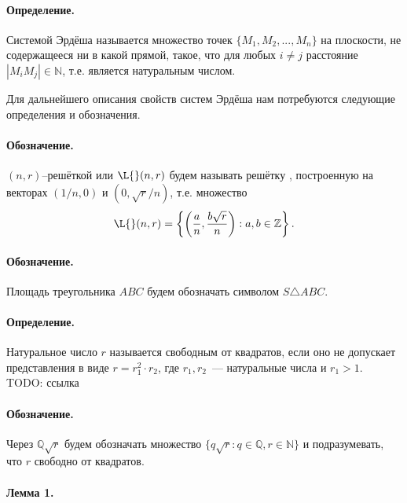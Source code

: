\documentclass[a4paper,14pt]{article} %
\begin{document}
\renewcommand{\bibname}{Список цитированной литературы}
\renewcommand\refname{\bibname}

\paragraph{Определение.}
Системой Эрдёша называется множество точек $\{M_1, M_2, ..., M_n\}$ на плоскости, не содержащееся ни в какой прямой,
такое, что для любых $i\neq j$ расстояние $|M_i M_j| \in \mathbb{N}$,
т.е. является натуральным числом.

Для дальнейшего описания свойств систем Эрдёша нам потребуются следующие определения и обозначения.

\paragraph{Обозначение.}
$(n,r)$--решёткой или $\L{}(n,r)$ будем называть решётку \cite{polygons-on-lattices}, построенную на векторах $(1/n, 0)$ и $(0, \sqrt{r}/n)$,
т.е. множество
\begin{equation}
	\L{}(n,r) = \left\{
		\left( \frac{a}{n}, \frac{b\sqrt{r}}{n} \right):
		a,b \in \mathbb{Z}
	\right\}.
\end{equation}

\paragraph{Обозначение.}
Площадь треугольника $ABC$ будем обозначать символом $S\triangle ABC$.

\paragraph{Определение.}
Натуральное число $r$ называется свободным от квадратов, если оно не допускает представления в виде $r = r_1^2 \cdot r_2$,
где $r_1, r_2$~--- натуральные числа и $r_1 > 1$.
TODO: ссылка

\paragraph{Обозначение.}
Через $\mathbb{Q}\sqrt{r}$ будем обозначать множество $\{q\sqrt{r} : q \in \mathbb{Q}, r\in\mathbb{N}\}$
и подразумевать, что $r$ свободно от квадратов.



\paragraph{Лемма 1.}
\end{document}
